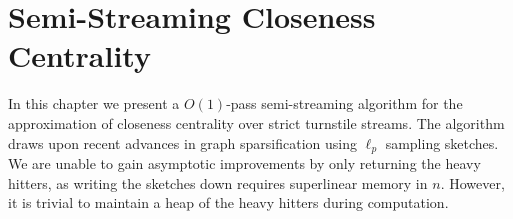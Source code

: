 \documentclass[10]{report}
\begin{document}






\chapter{Semi-Streaming Closeness Centrality} \label{chap:cc}

In this chapter we present a $O(1)$-pass semi-streaming algorithm for the approximation of closeness centrality over strict turnstile streams.
The algorithm draws upon recent advances in graph sparsification using $\ell_p$ sampling sketches.
We are unable to gain asymptotic improvements by only returning the heavy hitters, as writing the sketches down requires superlinear memory in $n$. 
However, it is trivial to maintain a heap of the heavy hitters during computation. 
\end{document}
